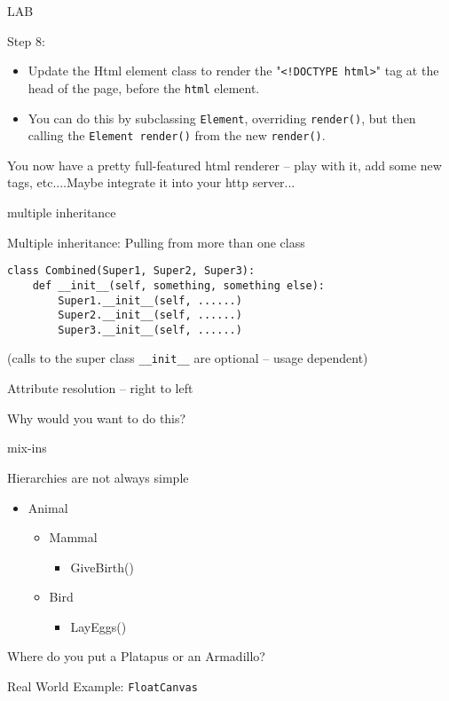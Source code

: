 \documentclass{beamer}
\begin{document}
\begin{frame}[fragile]{LAB}

{\Large Step 8:}

\begin{itemize}
   \item Update the Html element class to render the "\verb|<!DOCTYPE html>|" tag at the
   head of the page, before the \verb|html| element.
   
   \item You can do this by subclassing \verb|Element|, overriding \verb|render()|, but then
   calling the \verb|Element render()| from the new \verb|render()|.
\end{itemize}

\vfill
You now have a pretty full-featured html renderer -- play with it, add some
new tags, etc....Maybe integrate it into your http server...
\end{frame}



\begin{frame}[fragile]{multiple inheritance}

{\Large Multiple inheritance: Pulling from more than one class}

\vfill
\begin{verbatim}
class Combined(Super1, Super2, Super3):
    def __init__(self, something, something else):
        Super1.__init__(self, ......)        
        Super2.__init__(self, ......)        
        Super3.__init__(self, ......)        
\end{verbatim}
(calls to the super class \verb|__init__| are optional -- usage dependent)

\vfill
{\Large Attribute resolution -- right to left}

\vfill
{\Large Why would you want to do this?}

\end{frame} 

\begin{frame}[fragile]{mix-ins}

\vfill
{\Large Hierarchies are not always simple}
\vfill
\begin{itemize}
  \item Animal
  \begin{itemize}
    \item Mammal
    \begin{itemize}
      \item GiveBirth()
    \end{itemize}
    \item Bird
    \begin{itemize}
      \item LayEggs()
    \end{itemize}
  \end{itemize}
\end{itemize}
\vfill
{\Large Where do you put a Platapus or an Armadillo?}

\vfill
{\Large Real World Example: \verb|FloatCanvas|}
\end{frame} 

%
%
%
\end{document}
